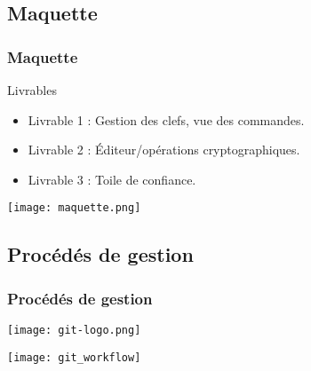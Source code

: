 \subsection{Maquette}
\begin{frame}
  \frametitle{\color{white} Maquette}
  \begin{block}{Livrables}
    \begin{itemize}
      \item Livrable 1 : Gestion des clefs, vue des commandes.
      \item Livrable 2 : Éditeur/opérations cryptographiques.
      \item Livrable 3 : Toile de confiance.
    \end{itemize}
  \end{block}
  \begin{center}
    \texttt{[image: maquette.png]}
  \end{center}
\end{frame}

\subsection{Procédés de gestion}
\begin{frame}
  \frametitle{\color{white} Procédés de gestion}
  \hfill
  \texttt{[image: git-logo.png]}
  \begin{center}
    \texttt{[image: git\_workflow]}
  \end{center}
\end{frame}